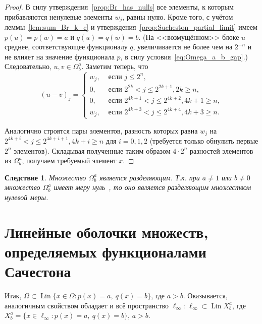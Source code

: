\documentclass[a4paper,14pt]{article} %
\theoremstyle{plain}
\newtheorem{corollary}{Следствие}[lemma]
\begin{document}
\begin{proof}
	В силу утверждения~\ref{prop:Br_has_nulls} все элементы, к которым прибавляются ненулевые элементы $w_j$, равны нулю.
	Кроме того, с учётом леммы~\ref{lem:sum_Br_k_c} и утверждения~\ref{prop:Sucheston_partial_limit}
	имеем $p(u)=p(w)=a$ и $q(u)=q(w)=b$.
	(На <<возмущённом>> блоке $u$ среднее, соответствующее функционалу $q$,
	увеличивается не более чем на $2^{-n}$ и не влияет на значение функционала $p$,
	в силу условия~\eqref{eq:Omega_a_b_gap}.)
	Следовательно, $u,v\in\Omega^a_b$.
	Заметим теперь, что
	\begin{equation}
		(u-v)_j = \begin{cases}
			w_j,  & \mbox{~если~} j \leq 2^n,
			\\
			0,  & \mbox{~если~} 2^{2k  } < j \leq 2^{2k+1}, 2k    \geq n,
			\\
			0,  & \mbox{~если~} 2^{4k+1} < j \leq 2^{4k+2}, 4k + 1 \geq n,
			\\
			w_j,  & \mbox{~если~} 2^{4k+3} < j \leq 2^{4k+4}, 4k + 3 \geq n
			.
		\end{cases}
	\end{equation}

	Аналогично строятся пары элементов, разность которых равна $w_j$ на $2^{4k+i} < j \leq 2^{4k+i+1}, 4k + i \geq n$ для $i=0,1,2$
	(требуется только обнулить первые $2^n$ элементов).
	Складывая полученные таким образом $4\cdot 2^n$ разностей элементов из $\Omega^a_b$, получаем требуемый элемент $x$.

\end{proof}

\begin{corollary}
	Множество $\Omega^a_b$ является разделяющим.
	Т.к. при $a\neq 1$ или $b\neq 0$ множество $\Omega^a_b$ имеет меру нуль~\cite{semenov2010characteristic,connor1990almost},
	то оно является разделяющим множеством нулевой меры.
\end{corollary}



\section{Линейные оболочки множеств, определяемых функционалами Сачестона}

Итак, $\Omega \subset \operatorname{Lin}\{x\in\Omega : p(x) = a,~ q(x) = b\}$, где $a>b$.
Оказывается, аналогичным свойством обладает и всё пространство $\ell_\infty$:
$\ell_\infty\subset \operatorname{Lin} X^a_b$, где
$X^a_b = \{x\in\ell_\infty : p(x) = a,~ q(x) = b\}$, $a>b$.
\end{document}
